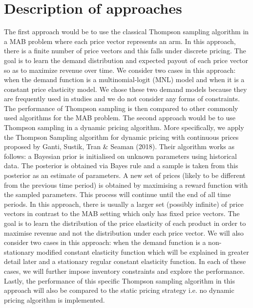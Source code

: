 \documentclass[a4paper]{article}
\begin{document}
\section{Description of approaches}
\label{sec:approach}
The first approach would be to use the classical Thompson sampling algorithm in a MAB problem where each price vector represents an arm. In this approach, there is a finite number of price vectors and this falls under discrete pricing. The goal is to learn the demand distribution and expected payout of each price vector so as to maximize revenue over time. We consider two cases in this approach: when the demand function is a multinomial-logit (MNL) model and when it is a constant price elasticity model. We chose these two demand models because they are frequently used in studies and we do not consider any forms of constraints. The performance of Thompson sampling is then compared to other commonly used algorithms for the MAB problem.
\newline
\newline
The second approach would be to use Thompson sampling in a dynamic pricing algorithm. More specifically, we apply the Thompson Sampling algorithm for dynamic pricing with continuous prices proposed by Ganti, Sustik, Tran \& Seaman (2018). Their algorithm works as follows: a Bayesian prior is initialised on unknown parameters using historical data. The posterior is obtained via Bayes rule and a sample is taken from this posterior as an estimate of parameters. A new set of prices (likely to be different from the previous time period) is obtained by maximising a reward function with the sampled parameters. This process will continue until the end of all time periods. In this approach, there is usually a larger set (possibly infinite) of price vectors in contrast to the MAB setting which only has fixed price vectors. The goal is to learn the distribution of the price elasticity of each product in order to maximise revenue and not the distribution under each price vector. We will also consider two cases in this approach: when the demand function is a non-stationary modified constant elasticity function which will be explained in greater detail later and a stationary regular constant elasticity function. In each of these cases, we will further impose inventory constraints and explore the performance. Lastly, the performance of this specific Thompson sampling algorithm in this approach will also be compared to the static pricing strategy i.e. no dynamic pricing algorithm is implemented.
\end{document}
